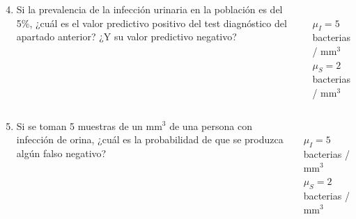\documentclass[aspectratio=149,10pt,t]{beamer}
\begin{document}
\begin{frame}
\begin{columns}
\begin{column}[T]{0.7\textwidth}
\begin{enumerate}
\setcounter{enumi}{3}
\item Si la prevalencia de la infección urinaria en la población es del 5\%, ¿cuál es el valor predictivo positivo del test
diagnóstico del apartado anterior? ¿Y su valor predictivo negativo?
\end{enumerate}
\end{column}
\begin{column}[T]{0.3\textwidth}
\\
$\mu_I = 5$ bacterias / mm$^3$\\
$\mu_S = 2$ bacterias / mm$^3$\\
\end{column}
\end{columns}
\end{frame}


\begin{frame}
\begin{columns}
\begin{column}[T]{0.7\textwidth}
\begin{enumerate}
\setcounter{enumi}{4}
\item Si se toman 5 muestras de un mm$^3$ de una persona con infección de orina, ¿cuál es la probabilidad de que se produzca
algún falso negativo?
\end{enumerate}
\end{column}
\begin{column}[T]{0.3\textwidth}
\\
$\mu_I = 5$ bacterias / mm$^3$\\
$\mu_S = 2$ bacterias / mm$^3$\\
\end{column}
\end{columns}
\end{frame}	
\end{document}
